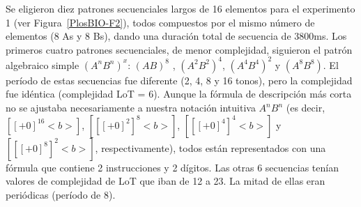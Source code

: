 Se eligieron diez patrones secuenciales largos de 16 elementos para el experimento 1 (ver Figura~\ref{PlosBIO-F2}), todos compuestos por el mismo número de elementos (8 As y 8 Bs), dando una duración total de secuencia de 3800ms. Los primeros cuatro patrones secuenciales, de menor complejidad, siguieron el patrón algebraico simple $(A^nB^n)^x$: $(AB)^8$ , $(A^2B^2)^4$, $(A^4B^4)^2$ y $(A^8B^8)$. El período de estas secuencias fue diferente (2, 4, 8 y 16 tonos), pero la complejidad fue idéntica (complejidad LoT = 6). Aunque la fórmula de descripción más corta no se ajustaba necesariamente a nuestra notación intuitiva $A^nB^n$ (es decir, $[[+0]^{16}<b>]$, $[[[+0]^2]^ 8 <b>]$, $[[ [+0] ^ 4] ^ 4 <b>]$ y $[[[+0] ^ 8] ^ 2 <b>]$, respectivamente), todos están representados con una fórmula que contiene 2 instrucciones y 2 dígitos. Las otras 6 secuencias tenían valores de complejidad de LoT que iban de 12 a 23. La mitad de ellas eran periódicas (período de 8).


